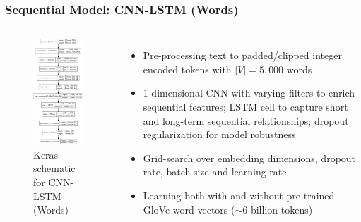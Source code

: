 \documentclass{beamer}
\begin{document}
\begin{framefont}{\footnotesize}
	\begin{frame}
		\frametitle{Sequential Model: CNN-LSTM (Words)}
		\vspace{-10pt}
		\begin{columns}
			\centering
			\begin{figure}
				\captionsetup{justification=centering}
				\includegraphics[width=3cm]{model.png}
				\caption{Keras schematic for CNN-LSTM (Words)}
			\end{figure}
			\begin{itemize}
				\setlength\itemsep{1.5em}
				\item Pre-processing text to padded/clipped integer encoded tokens with $|V| = 5,000$ words
				\item 1-dimensional CNN with varying filters to enrich sequential features; LSTM cell to capture short and long-term sequential relationships; dropout regularization for model robustness
				\item Grid-search over embedding dimensions, dropout rate, batch-size and learning rate
				\item Learning both with and without pre-trained GloVe word vectors ($\sim$6 billion tokens)
			\end{itemize}
		\end{columns}
	\end{frame}
\end{framefont}
\end{document}
